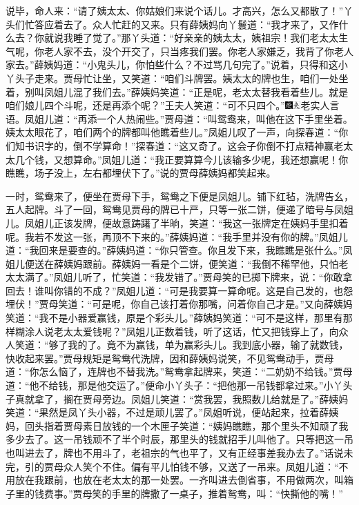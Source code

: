 说毕，命人来：“请了姨太太、你姑娘们来说个话儿。才高兴，怎么又都散了！”丫头们忙答应着去了。众人忙赶的又来。只有薛姨妈向丫鬟道：“我才来了，又作什么去？你就说我睡了觉了。”那丫头道：“好亲亲的姨太太，姨祖宗！我们老太太生气呢，你老人家不去，没个开交了，只当疼我们罢。你老人家嫌乏，我背了你老人家去。”薛姨妈道：“小鬼头儿，你怕些什么？不过骂几句完了。”说着，只得和这小丫头子走来。贾母忙让坐，又笑道：“咱们斗牌罢。姨太太的牌也生，咱们一处坐着，别叫凤姐儿混了我们去。”薛姨妈笑道：“正是呢，老太太替我看着些儿。就是咱们娘儿四个斗呢，还是再添个呢？”王夫人笑道：“可不只四个。”{\includegraphics[width=3mm]{../Images/00004}\includegraphics[width=3mm]{../Images/00012}\footnotesize \kaishu 老实人言语。}凤姐儿道：“再添一个人热闹些。”贾母道：“叫鸳鸯来，叫他在这下手里坐着。姨太太眼花了，咱们两个的牌都叫他瞧着些儿。”凤姐儿叹了一声，向探春道：“你们知书识字的，倒不学算命！”探春道：“这又奇了。这会子你倒不打点精神赢老太太几个钱，又想算命。”凤姐儿道：“我正要算算今儿该输多少呢，我还想赢呢！你瞧瞧，场子没上，左右都埋伏下了。”说的贾母薛姨妈都笑起来。

一时，鸳鸯来了，便坐在贾母下手，鸳鸯之下便是凤姐儿。铺下红毡，洗牌告幺，五人起牌。斗了一回，鸳鸯见贾母的牌已十严，只等一张二饼，便递了暗号与凤姐儿。凤姐儿正该发牌，便故意踌躇了半晌，笑道：“我这一张牌定在姨妈手里扣着呢。我若不发这一张，再顶不下来的。”薛姨妈道：“我手里并没有你的牌。”凤姐儿道：“我回来是要查的。”薛姨妈道：“你只管查。你且发下来，我瞧瞧是张什么。”凤姐儿便送在薛姨妈跟前。薛姨妈一看是个二饼，便笑道：“我倒不稀罕他，只怕老太太满了。”凤姐儿听了，忙笑道：“我发错了。”贾母笑的已掷下牌来，说：“你敢拿回去！谁叫你错的不成？”凤姐儿道：“可是我要算一算命呢。这是自己发的，也怨埋伏！”贾母笑道：“可是呢，你自己该打着你那嘴，问着你自己才是。”又向薛姨妈笑道：“我不是小器爱赢钱，原是个彩头儿。”薛姨妈笑道：“可不是这样，那里有那样糊涂人说老太太爱钱呢？”凤姐儿正数着钱，听了这话，忙又把钱穿上了，向众人笑道：“够了我的了。竟不为赢钱，单为赢彩头儿。我到底小器，输了就数钱，快收起来罢。”贾母规矩是鸳鸯代洗牌，因和薛姨妈说笑，不见鸳鸯动手，贾母道：“你怎么恼了，连牌也不替我洗。”鸳鸯拿起牌来，笑道：“二奶奶不给钱。”贾母道：“他不给钱，那是他交运了。”便命小丫头子：“把他那一吊钱都拿过来。”小丫头子真就拿了，搁在贾母旁边。凤姐儿笑道：“赏我罢，我照数儿给就是了。”薛姨妈笑道：“果然是凤丫头小器，不过是顽儿罢了。”凤姐听说，便站起来，拉着薛姨妈，回头指着贾母素日放钱的一个木匣子笑道：“姨妈瞧瞧，那个里头不知顽了我多少去了。这一吊钱顽不了半个时辰，那里头的钱就招手儿叫他了。只等把这一吊也叫进去了，牌也不用斗了，老祖宗的气也平了，又有正经事差我办去了。”话说未完，引的贾母众人笑个不住。偏有平儿怕钱不够，又送了一吊来。凤姐儿道：“不用放在我跟前，也放在老太太的那一处罢。一齐叫进去倒省事，不用做两次，叫箱子里的钱费事。”贾母笑的手里的牌撒了一桌子，推着鸳鸯，叫：“快撕他的嘴！”

